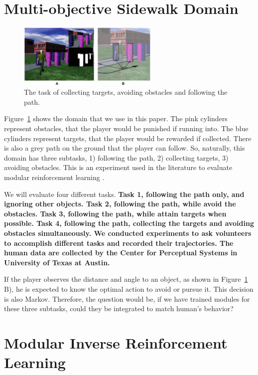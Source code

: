 \documentclass[11pt]{article} %
\begin{document}
\section{Multi-objective Sidewalk Domain}
\label{sec:domain}

\begin{figure}[h!]
\centering
\includegraphics[width=0.6\textwidth]{avatar.png}
\caption{The task of collecting targets, avoiding obstacles and following the
path. \cite{rothkopf2013modular}}
\label{fig:avatar}
\end{figure}

Figure~\ref{fig:avatar} shows the domain that we use in this paper. The pink
cylinders represent obstacles, that the player would be punished if running
into. The blue cylinders represent targets, that the player would be rewarded if
collected. There is also a grey path on the ground that the player can follow.
So, naturally, this domain has three subtasks, 1) following the path, 2)
collecting targets, 3) avoiding obstacles. This is an experiment used in the
literature to evaluate modular reinforcement learning
\cite{rothkopf2013modular}.

We will evaluate four different tasks. \bf{Task 1}, following the path only, and
ignoring other objects. \bf{Task 2}, following the path, while avoid the obstacles.
\bf{Task 3}, following the path, while attain targets when possible. \bf{Task 4},
following the path, collecting the targets and avoiding obstacles
simultaneously.
We conducted experiments to ask volunteers to accomplish different tasks and
recorded their trajectories. The human data are collected by the Center for
Perceptual Systems in University of Texas at Austin.

If the player observes the distance and angle to an object, as shown in
Figure~\ref{fig:avatar} B), he is expected to know the optimal action to avoid
or pursue it. This decision is also Markov. Therefore, the question would be, if
we have trained modules for these three subtasks, could they be integrated to
match human's behavior?

\section{Modular Inverse Reinforcement Learning}
\label{sec:rl}
\end{document}
